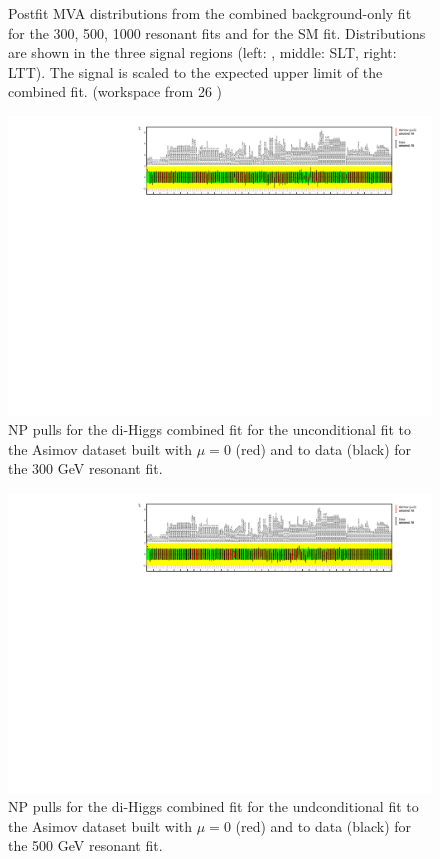 \begin{figure}[htbp]
  \caption{Postfit MVA distributions from the combined background-only fit for the 300, 500, 1000 resonant fits and for the SM fit.  Distributions are shown in the three signal regions (left:
    \hadhad, middle: \lephad SLT, right: \lephad LTT). The signal is scaled to the expected upper limit of
    the combined fit. (workspace from 26 )}
  \label{fig:mva_postfit_combined}
\end{figure}


\begin{figure}
\centering
\includegraphics[angle=270]{figures/results/HH/Combined/NP_allExceptGammas_2HDM300.pdf}
\caption{NP pulls for the di-Higgs combined fit for the unconditional fit to the Asimov dataset built with $\mu=0$ (red) and to data (black) for the 300 GeV resonant fit.}
\label{fig:CombinedPostfitNPPulls2HDM300}
\end{figure}

\begin{figure}
\centering
\includegraphics[angle=270]{figures/results/HH/Combined/NP_allExceptGammas_2HDM500.pdf}
\caption{NP pulls for the di-Higgs combined fit for the undconditional  fit to the Asimov dataset built with $\mu=0$ (red) and to data (black) for the 500 GeV  resonant fit.}
\label{fig:CombinedPostfitNPPulls2HDM500}
\end{figure}

